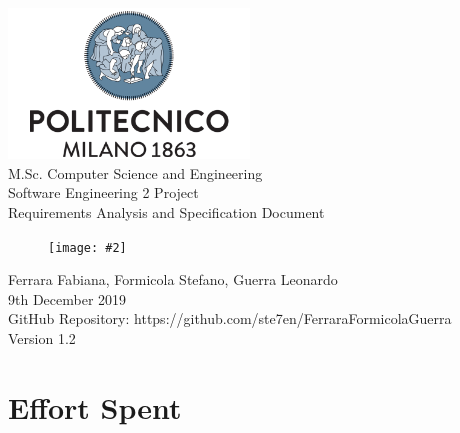 \documentclass{report}
\newcommand{\image}[4]{
	\begin{figure}[H]
	\centering
	\texttt{[image: \#2]}
	\caption*{#3}
	\label{#4}

	\label{fig:nonfloat} %
	\end{figure}
}
\begin{document}
	\begin{titlepage}
		\centering	
		\vfill
		{
			\includegraphics[width =\linewidth, height = 4cm, keepaspectratio]{PolitecnicoLogo.png}
			\label{fig:PolitecnicoLogo}
			\large \\[2ex]M.Sc. Computer Science and Engineering\\
			\large Software Engineering 2 Project\\[9ex]			
			\huge Requirements Analysis and Specification Document\\[4ex]
			\image{3cm}{Images/Logo.png}{}{Logo}

			\normalsize Ferrara Fabiana, Formicola Stefano, Guerra Leonardo\\[1.5ex]
			\normalsize 9th December 2019 \\[1.5ex]
			\normalsize GitHub Repository: https://github.com/ste7en/FerraraFormicolaGuerra\\[3ex]
			\normalsize Version 1.2


		}
		
	\end{titlepage}


	
	\newpage
	\tableofcontents
	\thispagestyle{fancy}
	
	\newpage
	
	
	
	
	
		
	\chapter{Effort Spent}
	\thispagestyle{fancy}
\end{document}
